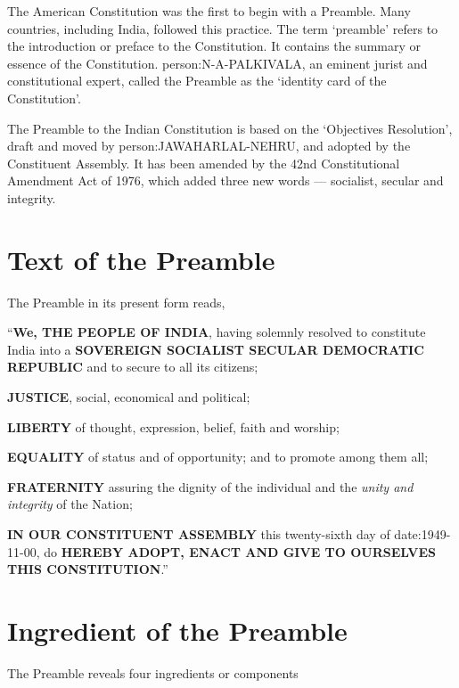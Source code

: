 The American Constitution was the first to begin with a Preamble. Many countries, including India, followed this practice. The term `preamble' refers to the introduction or preface to the Constitution. It contains the summary or essence of the Constitution. \gls{person:N-A-PALKIVALA}, an eminent jurist and constitutional expert, called the Preamble as the `identity card of the Constitution'.

The Preamble to the Indian Constitution is based on the `Objectives Resolution', draft and moved by \gls{person:JAWAHARLAL-NEHRU}, and adopted by the Constituent Assembly. It has been amended by the 42nd Constitutional Amendment Act of 1976, which added three new words — socialist, secular and integrity.

\section{Text of the Preamble}

The Preamble in its present form reads,

\textquotedblleft \textbf{We, THE PEOPLE OF INDIA}, having solemnly resolved to constitute\\India into a \textbf{SOVEREIGN SOCIALIST SECULAR DEMOCRATIC REPUBLIC} and to secure to all its citizens;
\begin{list}{}{}
  \item \textbf{JUSTICE}, social, economical and political;
  \item \textbf{LIBERTY} of thought, expression, belief, faith and worship;
  \item \textbf{EQUALITY} of status and of opportunity; and to promote among them all;
  \item \textbf{FRATERNITY} assuring the dignity of the individual and the \textit{unity and integrity} of the Nation;
\end{list}
\textbf{IN OUR CONSTITUENT ASSEMBLY} this twenty-sixth day of \gls{date:1949-11-00}, do \textbf{HEREBY ADOPT, ENACT AND GIVE TO OURSELVES THIS CONSTITUTION}.\textquotedblright

\section{Ingredient of the Preamble}

The Preamble reveals four ingredients or components

